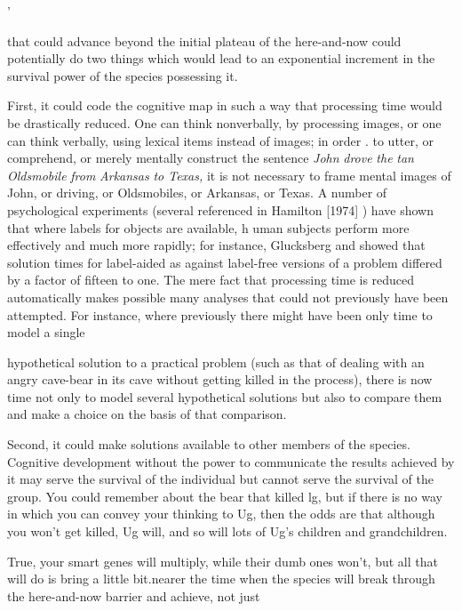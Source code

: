 '

that could advance beyond the initial plateau of the here-and-now could potentially do two things which would lead to an exponential increment in the survival power of the species possessing it.

First, it could code the cognitive map in such a way that process\-ing time would be drastically reduced. One can think nonverbally, by processing images, or one can think verbally, using lexical items instead of images; in order . to utter, or comprehend, or merely mentally con\-struct the sentence \textit{John} \textit{drove} \textit{the} \textit{tan} \textit{Oldsmobile} \textit{from} \textit{Arkansas} \textit{to Texas,} it is not necessary to frame mental images of John, or driving, or Oldsmobiles, or Arkansas, or Texas. A number of psychological experi\-ments (several referenced in Hamilton [1974] ) have shown that where labels for objects are available, h uman subjects perform more effec\-tively and much more rapidly; for instance, Glucksberg and \citet{Weisberg1966} showed that solution times for label-aided as against label-free versions of a problem differed by a factor of fifteen to one. The mere fact that processing time is reduced automatically makes possible many analyses that could not previously have been attempted. For instance, where previously there might have been only time to model a single

hypothetical solution to a practical problem (such as that of dealing with an angry cave-bear in its cave without getting killed in the process), there is now time not only to model several hypothetical solutions but also to compare them and make a choice on the basis of that comparison.

Second, it could make solutions available to other members of the species. Cognitive development without the power to communi\-cate the results achieved by it may serve the survival of the individual but cannot serve the survival of the group. You could remember about the bear that killed lg, but if there is no way in which you can convey your thinking to Ug, then the odds are that although you won't get killed, Ug will, and so will lots of Ug's children and grandchildren.

True, your smart genes will multiply, while their dumb ones won't, but all that will do is bring a little bit.nearer the time when the species will break through the here-and-now barrier and achieve, not just


